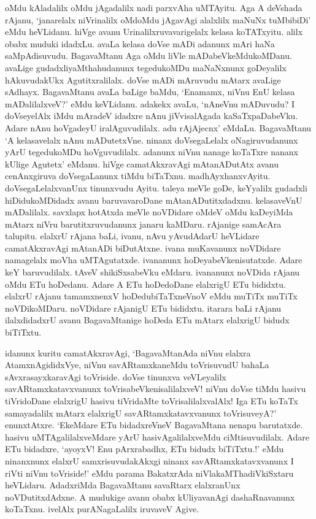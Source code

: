 oMdu kAladalilx oMdu jAgadalilx nadi parxvAha uMTAyitu. Aga A deVshada rAjanu, `janarelalx niVrinalilx oMdoMdu jAgavAgi alalxlilx maNuNx tuMbibiDi' eMdu heVLidanu. hiVge avanu Urinalilxruvavarigelalx kelasa koTATxyitu. alilx obabx muduki idadxLu. avaLa kelasa doVse mADi adanunx mAri haNa saMpAdisuvudu. BagavaMtanu Aga oMdu liVle mADabeVkeMdukoMDanu. avaLige gudadxliyaMthahudanunx tegedukoMDu maNaNxnunx goDeyalilx hAkuvudakUkx Agutitxralilalx. doVse mADi mAruvudu mAtarx avaLige sAdhayx. BagavaMtanu avaLa baLige baMdu, `Enamamx, niVnu EnU kelasa mADalilalxveV?' eMdu keVLidanu. adakekx avaLu, `nAneVnu mADuvudu? I doVseyelAlx iMdu mAradeV idadxre nAnu jiVvisalAgada kaSaTxpaDabeVku. Adare nAnu hoVgadeyU iralAguvudilalx. adu rAjAjecnx' eMdaLu. BagavaMtanu `A kelasavelalx nAnu mADutetxVne. ninanx doVsegaLelalx oNagiruvudanunx yArU tegedukoMDu hoVguvudilalx. adanunx niVnu nanage koTaTxre nananx kUlige Agutetx' eMdanu. hiVge camatAkxravAgi mAtanADutAtx avanu cenAnxgiruva doVsegaLanunx tiMdu biTaTxnu. madhAyxhanxvAyitu. doVsegaLelalxvanUnx tinunxvudu Ayitu. taleya meVle goDe, keYyalilx gudadxli hiDidukoMDidadx avanu baruvavaroDane mAtanADutitxdadxnu. kelasaveVnU mADalilalx. savxlapx hotAtxda meVle noVDidare oMdeV oMdu kaDeyiMda mAtarx niVru barutitxruvudanunx janaru kaMDaru. rAjanige samAcAra talupitu. elalxrU rAjana baLi, ivanu, nAvu yAvudAdarU heVLidare camatAkxravAgi mAtanADi biDutAtxne. ivana muKavanunx noVDidare namagelalx moVha uMTAgutatxde. ivananunx hoDeyabeVkenisutatxde. Adare keY baruvudilalx. tAveV shikiSxsabeVku eMdaru. ivananunx noVDida rAjanu oMdu ETu hoDedanu. Adare A ETu hoDedoDane elalxrigU ETu bididxtu. elalxrU rAjanu tamamxnenxV hoDedubiTaTxneVnoV eMdu muTiTx muTiTx noVDikoMDaru. noVDidare rAjanigU ETu bididxtu. itarara baLi rAjanu ilalxdidadxrU avanu BagavaMtanige hoDeda ETu mAtarx elalxrigU bidudx biTiTxtu.

idanunx kuritu camatAkxravAgi, `BagavaMtanAda niVnu elalxra AtamxnAgididxVye, niVnu savARtamxkaneMdu toVrisuvudU bahaLa sAvxrasayxkaravAgi toVriside. doVse tinunxva veVLeyalilx savARtamxkatavxvanunx toVrisabeVkenisalilalxveV! niVnu doVse tiMdu hasivu tiVridoDane elalxrigU hasivu tiVridaMte toVrisalilalxvalAlx! Iga ETu koTaTx samayadalilx mAtarx elalxrigU savARtamxkatavxvanunx toVrisuveyA?' enunxtAtxre. `EkeMdare ETu bidadxreVneV BagavaMtana nenapu barutatxde. hasivu uMTAgalilalxveMdare yArU hasivAgalilalxveMdu ciMtisuvudilalx. Adare ETu bidadxre, `ayoyxV! Enu pArxrabadhx, ETu bidudx biTiTxtu.!' eMdu ninanxnunx elalxrU samxrisuvudakAkxgi ninanx savARtamxkatavxvanunx I riVti niVnu toVriside!' eMdu parama BakatxrAda niVlakaMThadiVkiSxtaru heVLidaru. AdadxriMda BagavaMtanu savaRtarx elalxranUnx noVDutitxdAdxne. A mudukige avanu obabx kUliyavanAgi dashaRnavanunx koTaTxnu. ivelAlx purANagaLalilx iruvaveV Agive.

